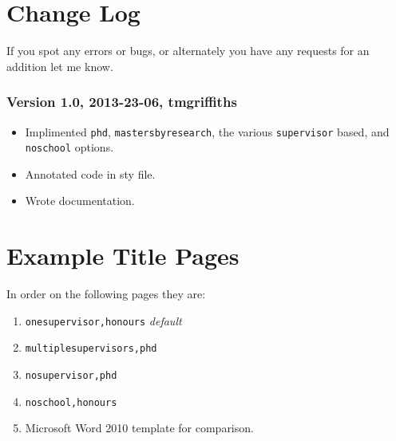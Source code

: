 \documentclass[12pt,oneside]{article}
\newcommand{\oporcom}[1]{\texttt{\color{RoyalBlue}#1}} %
\begin{document}
\section{Change Log}
If you spot any errors or bugs, or alternately you have any requests for an addition let me know.
\subsubsection*{Version 1.0, 2013-23-06, tmgriffiths}
\begin{itemize}
    \item Implimented \oporcom{phd}, \oporcom{mastersbyresearch}, the various \oporcom{supervisor} based, and \oporcom{noschool} options.
    \item Annotated code in sty file.
    \item Wrote documentation.
\end{itemize}

\section{Example Title Pages}
In order on the following pages they are:
\begin{enumerate}
    \item \oporcom{onesupervisor,honours} \emph{default}
    \item \oporcom{multiplesupervisors,phd}
    \item \oporcom{nosupervisor,phd}
    \item \oporcom{noschool,honours}
    \item Microsoft Word 2010 template for comparison.
\end{enumerate}





\end{document}
